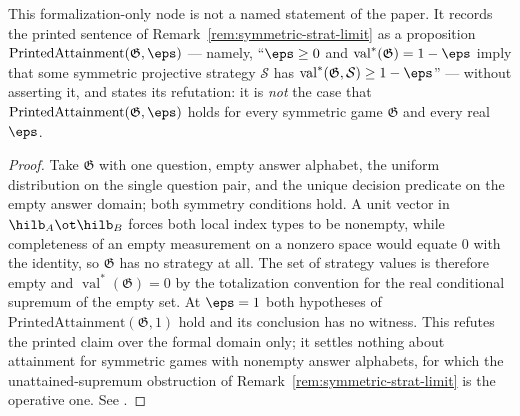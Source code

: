 \begin{lemma}
	\label{lem:symmetric-strat-printed-claim}
	\leanok
	This formalization-only node is not a named statement of the paper. It records the printed sentence of Remark~\ref{rem:symmetric-strat-limit} as a proposition $\mathrm{PrintedAttainment}(\mathfrak G, \eps)$ --- namely, ``$\eps \ge 0$ and $\operatorname{val}^*(\mathfrak G) = 1-\eps$ imply that some symmetric projective strategy $\mathcal S$ has $\operatorname{val}^*(\mathfrak G, \mathcal S) \ge 1-\eps$'' --- without asserting it, and states its refutation: it is \emph{not} the case that $\mathrm{PrintedAttainment}(\mathfrak G, \eps)$ holds for every symmetric game $\mathfrak G$ and every real $\eps$.
\end{lemma}
\begin{proof}
	\leanok
	Take $\mathfrak G$ with one question, empty answer alphabet, the uniform distribution on the single question pair, and the unique decision predicate on the empty answer domain; both symmetry conditions hold. A unit vector in $\hilb_A \ot \hilb_B$ forces both local index types to be nonempty, while completeness of an empty measurement on a nonzero space would equate $0$ with the identity, so $\mathfrak G$ has no strategy at all. The set of strategy values is therefore empty and $\operatorname{val}^*(\mathfrak G) = 0$ by the totalization convention for the real conditional supremum of the empty set. At $\eps = 1$ both hypotheses of $\mathrm{PrintedAttainment}(\mathfrak G, 1)$ hold and its conclusion has no witness. This refutes the printed claim over the formal domain only; it settles nothing about attainment for symmetric games with nonempty answer alphabets, for which the unattained-supremum obstruction of Remark~\ref{rem:symmetric-strat-limit} is the operative one. See \cite{gap:qpbt_symmetrization-attainment}.
\end{proof}

